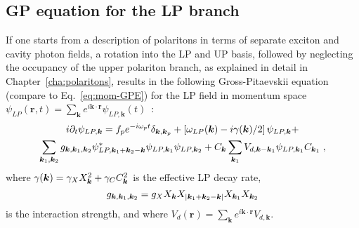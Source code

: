 \begin{subappendices}
\section{GP equation for the LP branch}
\label{app:full}
%
If one starts from a description of polaritons in terms of separate
exciton and cavity photon fields, a rotation into the LP and UP basis,
followed by neglecting the occupancy of the upper polariton branch, as
explained in detail in Chapter~\ref{cha:polaritons}, results in the
following Gross-Pitaevskii equation (compare to
Eq.~\eqref{eq:mom-GPE}) for the LP field in momentum space
$\psi_{LP}(\bm{r},t) = \sum_{\bm{k}} e^{i\bm{k}\cdot \bm{r}}
\psi_{LP,\bm{k}} (t)$~\cite{Ciuti_2003}:
%
\begin{multline}
  i\partial_t \psi_{LP,\bm{k}} = f_p e^{-i\omega_p t}
  \delta_{\bm{k},\bm{k}_p} + \left[\omega_{LP} (\kv) - i\gamma
    (\kv)/2\right]\psi_{LP,\bm{k}} +\\
%
  \sum_{\bm{k}_1, \bm{k}_2} g_{\bm{k}, \bm{k}_1, \bm{k}_2}
  \psi^*_{LP,\bm{k}_1 + \bm{k}_2-\bm{k}} \psi_{LP,\bm{k}_1}
  \psi_{LP,\bm{k}_2} + C_{\kv} \sum_{\bm{k}_1} V_{d,{\bm{k} - \bm{k}_1}} \psi_{LP,\bm{k}_1} C_{\kv_1}\; ,
\end{multline}
%
where $\gamma(\bm{k})=\gamma_X X^2_{\bm{k}} + \gamma_C C^2_{\bm{k}}$ is the effective LP
decay rate,
%
\begin{equation}
  g_{\bm{k}, \bm{k}_1, \bm{k}_2}=g_X X_{\bm{k}}X_{|\bm{k}_1 + \bm{k}_2-\bm{k}|} X_{\bm{k}_1} X_{\bm{k}_2}
\end{equation}
%
is the interaction strength, and where
$V_d(\bm{r}) = \sum_{\bm{k}} e^{i\bm{k}\cdot \bm{r}} V_{d,{\bm{k}}}$.


\end{subappendices}
